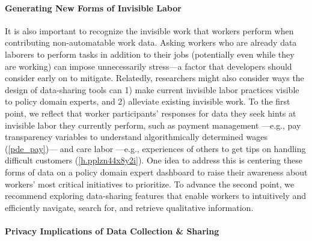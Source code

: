 \paragraph{Generating New Forms of Invisible Labor}
It is also important to recognize the invisible work that workers perform when contributing non-automatable work data. 
Asking workers who are already data laborers \cite{GUVs} to perform tasks in addition to their jobs (potentially even while they are working) can impose unnecessarily stress---a factor that developers should consider early on to mitigate. 
Relatedly, researchers might also consider ways the design of data-sharing tools can 1) make current invisible labor practices visible to policy domain experts, and 2) alleviate existing invisible work.
To the first point, we reflect that worker participants' responses for data they seek hints at invisible labor they currently perform, such as payment management \cite{toxtli2021quantifying}---e.g., pay transparency variables to understand algorithmically determined wages (\ref{pde_pay})---
and care labor \cite{raval2016standing}---e.g., experiences of others to get tips on handling difficult customers (\ref{h.pplzn44x8y2i}). One idea to address this is centering these forms of data on a policy domain expert dashboard to raise their awareness about {workers' most critical} initiatives to prioritize. To advance the second point, {we recommend exploring data-sharing features that} {enable} workers {to} {intuitively and efficiently navigate, search for, and retrieve qualitative information.} %


\paragraph{Privacy Implications of Data Collection \& Sharing}

